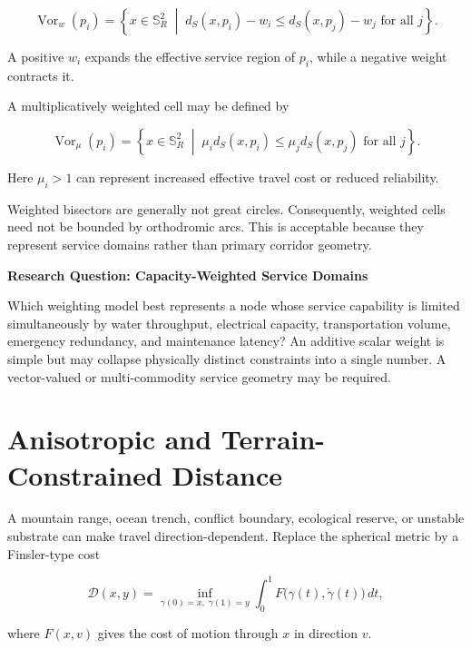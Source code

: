 \documentclass[11pt,fleqn]{book}
\numberwithin{equation}{chapter}
\newenvironment{research}[1]
  {\begin{researchEnv}
   \noindent\textbf{Research Question: #1}\par\smallskip}
  {\end{researchEnv}}
\theoremstyle{plain}
\theoremstyle{definition}
\theoremstyle{remark}
\newcommand{\Sphere}{\mathbb{S}^{2}}
\newcommand{\Vor}{\operatorname{Vor}}
\newcommand{\suchthat}{\;\middle|\;}
\begin{document}
\begin{equation}
    \Vor_w(p_i)
    =
    \left\{
    x\in\Sphere_R
    \suchthat
    d_S(x,p_i)-w_i
    \leq
    d_S(x,p_j)-w_j
    \text{ for all }j
    \right\}.
\end{equation}

A positive \(w_i\) expands the effective service region of \(p_i\), while a negative weight contracts it.

A multiplicatively weighted cell may be defined by

\begin{equation}
    \Vor_\mu(p_i)
    =
    \left\{
    x\in\Sphere_R
    \suchthat
    \mu_i d_S(x,p_i)
    \leq
    \mu_j d_S(x,p_j)
    \text{ for all }j
    \right\}.
\end{equation}

Here \(\mu_i>1\) can represent increased effective travel cost or reduced reliability.

Weighted bisectors are generally not great circles. Consequently, weighted cells need not be bounded by orthodromic arcs. This is acceptable because they represent service domains rather than primary corridor geometry.

\begin{research}{Capacity-Weighted Service Domains}
Which weighting model best represents a node whose service capability is limited simultaneously by water throughput, electrical capacity, transportation volume, emergency redundancy, and maintenance latency? An additive scalar weight is simple but may collapse physically distinct constraints into a single number. A vector-valued or multi-commodity service geometry may be required.
\end{research}

\section{Anisotropic and Terrain-Constrained Distance}

A mountain range, ocean trench, conflict boundary, ecological reserve, or unstable substrate can make travel direction-dependent. Replace the spherical metric by a Finsler-type cost

\begin{equation}
    \mathcal{D}(x,y)
    =
    \inf_{\gamma(0)=x,\;\gamma(1)=y}
    \int_0^1
    F\bigl(\gamma(t),\dot\gamma(t)\bigr)
    \,dt,
\end{equation}

where \(F(x,v)\) gives the cost of motion through \(x\) in direction \(v\).
\end{document}
